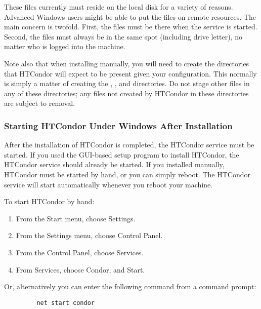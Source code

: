 \begin{description}
These files currently must reside on the local disk for a variety of reasons.
Advanced Windows users might be able to put the files on remote resources.
The main concern is twofold.  First, the files must be there when the service
is started.  Second, the files must always be in the same spot (including
drive letter), no matter who is logged into the machine.  

Note also that when installing manually, you will need to create the
directories that HTCondor will expect to be present given your
configuration. This normally is simply a matter of creating the
, , and  directories.
Do not stage other files in any of these directories;
any files not created by HTCondor in these directories are subject to removal.


\end{description}


\subsubsection{\label{nt-installed-now-what}
Starting HTCondor Under Windows After Installation}

After the installation of HTCondor is completed, the HTCondor service
must be started.  If you used the GUI-based setup program to install
HTCondor, the HTCondor service should already be started.  If you installed
manually, HTCondor must
be started by hand, or you can simply reboot. \Note The HTCondor service
will start automatically whenever you reboot your machine.

To start HTCondor by hand:
\begin{enumerate}
\item From the Start menu, choose Settings.
\item From the Settings menu, choose Control Panel.
\item From the Control Panel, choose Services.
\item From Services, choose Condor, and Start.
\end{enumerate}

Or, alternatively you can enter the following command from a command prompt:
\begin{verbatim}
         net start condor
\end{verbatim}

